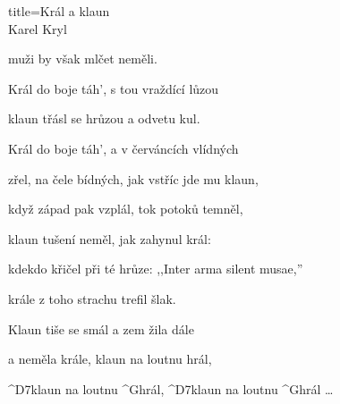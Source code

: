 \begin{song}{title=\centering Král a klaun \\\normalsize Karel Kryl  \vspace*{-0.3cm}}
{	muži by však mlčet neměli.

	Král do boje táh', s tou vraždící lůzou

	klaun třásl se hrůzou a odvetu kul.

\sloka
	Král do boje táh', a v červáncích vlídných

	zřel, na čele bídných, jak vstříc jde mu klaun,

	když západ pak vzplál, tok potoků temněl,

	klaun tušení neměl, jak zahynul král:

	kdekdo křičel při té hrůze: ,,Inter arma silent musae,''

	krále z toho strachu trefil šlak.

	Klaun tiše se smál a zem žila dále
	
	a neměla krále, klaun na loutnu hrál,

	^{D7}klaun na loutnu ^{G}hrál, ^{D7}klaun na loutnu ^{G}hrál \ldots




}
\setcounter{Slokočet}{0}
\end{song}

